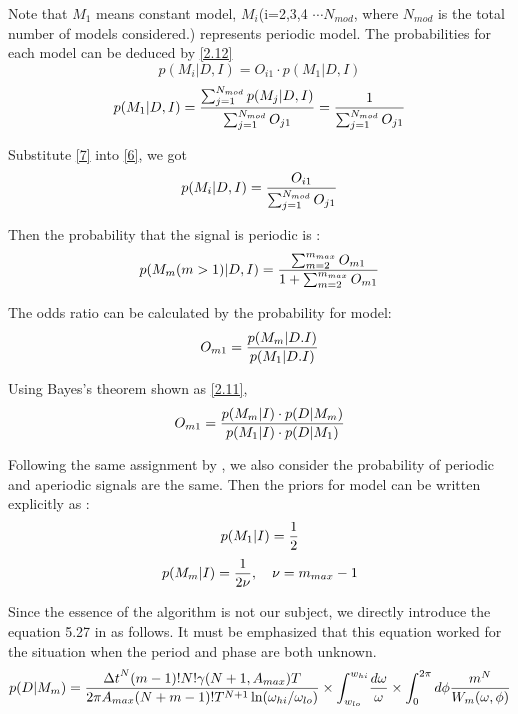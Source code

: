 \documentclass[twoside,twocolumn]{aastex63}
\begin{document}
Note that $M_1$ means constant model, $M_i$(i=2,3,4 $\cdots N_{mod}$, where $N_{mod}$ is the total number of models considered.) represents periodic model. The probabilities for each model can be deduced by \ref{2.12}
\begin{equation}\label{6}
p(M_i|D,I)=O_{i1}\cdot p(M_1|D,I)
\end{equation}
\begin{equation}\label{7}
p(M_1|D,I)={{\sum_{j=1}^{N_{mod}} p(M_j|D,I)}\over {\sum_{j=1}^{N_{mod}} O_{j1}}}
={1\over {\sum_{j=1}^{N_{mod}} O_{j1}}}	
\end{equation}

Substitute \ref{7} into \ref{6}, we got
\begin{equation}\label{2.13}
p(M_i|D,I)={O_{i1}\over {\sum_{j=1}^{N_{mod}} O_{j1}}}
\end{equation}

Then the probability that the signal is periodic is :
\begin{equation}\label{5.2}
p(M_m(m>1)|D,I)={{\sum_{m=2}^{m_{max}} O_{m1}}\over {1+\sum_{m=2}^{m_{max}} O_{m1}}}
\end{equation}

The odds ratio can be calculated by the probability for model:
\begin{equation}
O_{m1}={{p(M_m|D.I)}\over {p(M_1|D.I)}}
\end{equation}

Using Bayes's theorem shown as \ref{2.11},
\begin{equation}\label{11}
O_{m1}={{p(M_m|I)\cdot p(D|M_m)}\over {p(M_1|I)\cdot p(D|M_1)}}
\end{equation}

Following the same assignment by \citep{1992ApJ...398..146G}, we also consider the probability of periodic and aperiodic signals are the same. Then the priors for model can be written explicitly as :
\begin{equation}\label{12}
p(M_1|I)={1\over 2}	
\end{equation}
\begin{equation}\label{13}
p(M_m|I)={1\over {2\nu}}	, \quad \nu =m_{max}-1
\end{equation}

Since the essence of the algorithm is not our subject, we directly introduce the equation 5.27 in \citep{1992ApJ...398..146G} as follows. It must be emphasized that this equation worked for the situation when the period and phase are both unknown. 
\begin{equation}\label{5.27}
p(D|M_m)={{{\Delta t}^N (m-1)! N! \gamma(N+1,A_{max})T}\over{2\pi A_{max} (N+m-1)!T^{N+1} \ln(\omega_{hi}/\omega_{lo})}}\times {\int_{w_{lo}}^{w_{hi}}}{{d\omega}\over{\omega}}\times {\int_0^{2\pi}d\phi{m^N\over W_m(\omega,\phi)}}	
\end{equation}
\end{document}
